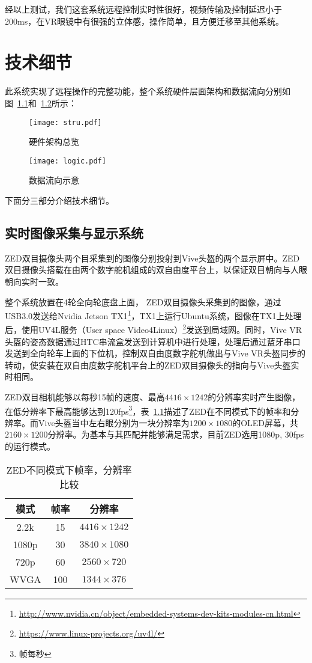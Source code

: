经以上测试，我们这套系统远程控制实时性很好，视频传输及控制延迟小于200ms，在VR眼镜中有很强的立体感，操作简单，且方便迁移至其他系统。



\chapter{技术细节}

此系统实现了远程操作的完整功能，整个系统硬件层面架构和数据流向分别如图~\ref{stru}和~\ref{logic}所示：

\begin{figure}[htbp]
\small
\centering
\texttt{[image: stru.pdf]}
\caption{硬件架构总览} 
\label{stru}
\end{figure}

\begin{figure}[htbp]
\small
\centering
\texttt{[image: logic.pdf]}
\caption{数据流向示意} 
\label{logic}
\end{figure}

下面分三部分介绍技术细节。

\section{实时图像采集与显示系统}
ZED双目摄像头两个目采集到的图像分别投射到Vive头盔的两个显示屏中。ZED双目摄像头搭载在由两个数字舵机组成的双自由度平台上，以保证双目朝向与人眼朝向实时一致。

整个系统放置在4轮全向轮底盘上面， ZED双目摄像头采集到的图像，通过USB3.0发送给Nvidia Jetson TX1\footnote{\url{http://www.nvidia.cn/object/embedded-systems-dev-kits-modules-cn.html}}，TX1上运行Ubuntu系统，图像在TX1上处理后，使用UV4L服务（User space Video4Linux）\footnote{\url{https://www.linux-projects.org/uv4l/}}发送到局域网。同时，Vive VR头盔的姿态数据通过HTC串流盒发送到计算机中进行处理，处理后通过蓝牙串口发送到全向轮车上面的下位机，控制双自由度数字舵机做出与Vive VR头盔同步的转动，使安装在双自由度数字舵机平台上的ZED双目摄像头的指向与Vive头盔实时相同。

ZED双目相机能够以每秒15帧的速度、最高$4416\times1242$的分辨率实时产生图像，在低分辨率下最高能够达到120fps\footnote{帧每秒}，表~\ref{zhenlv}描述了ZED在不同模式下的帧率和分辨率。而Vive头盔当中左右眼分别为一块分辨率为$1200\times1080$的OLED屏幕，共$2160\times1200$分辨率。为基本与其匹配并能够满足需求，目前ZED选用1080p, 30fps的运行模式。

\begin{table}[htbp]
	\centering
	\caption{ZED不同模式下帧率，分辨率比较}
	\begin{tabular}{ccc}
		\toprule
		模式    & 帧率    & 分辨率 \\
		\midrule
		2.2k  & 15    & $4416\times1242$ \\
		\midrule
		1080p & 30    & $3840\times1080$ \\
		\midrule
		720p  & 60    & $2560\times720$ \\
		\midrule
		WVGA  & 100   & $1344\times376$ \\
		\bottomrule
	\end{tabular}%
\label{zhenlv}
\end{table}%


